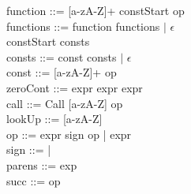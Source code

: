 function ::= [a-zA-Z]+ \bnf{=>} constStart op\\

functions ::= \bnf{,} function functions $\mid$ $\epsilon$\\

constStart \bnf{[} consts \bnf{]}\\

consts ::= const \bnf{,} consts $\mid$ $\epsilon$\\

const ::= [a-zA-Z]+ \bnf{=} op\\

zeroCont ::=  \bnf{(} expr \bnf{)} \bnf{\{} expr \bnf{\}}  \bnf{\{} expr \bnf{\}}\\

call ::= Call [a-zA-Z] op\\

lookUp ::=  [a-zA-Z]\\

op ::= expr sign op | expr\\

sign ::= \bnf{+} | \bnf{*}\\

parens ::=\bnf{(} exp \bnf{)}\\

succ ::=  op\\

